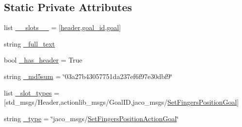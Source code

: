 \subsection*{Static Private Attributes}
\begin{DoxyCompactItemize}
\item 
list \hyperlink{classjaco__msgs_1_1msg_1_1__SetFingersPositionActionGoal_1_1SetFingersPositionActionGoal_a27494990bf3a0ffce3db9626f1a68484}{\+\_\+\+\_\+slots\+\_\+\+\_\+} = \mbox{[}\textquotesingle{}\hyperlink{classjaco__msgs_1_1msg_1_1__SetFingersPositionActionGoal_1_1SetFingersPositionActionGoal_aaab21a95f77c604078e24ad69f6c28c6}{header}\textquotesingle{},\textquotesingle{}\hyperlink{classjaco__msgs_1_1msg_1_1__SetFingersPositionActionGoal_1_1SetFingersPositionActionGoal_a8336121df2ce21765eb1e1e965fc01e5}{goal\+\_\+id}\textquotesingle{},\textquotesingle{}\hyperlink{classjaco__msgs_1_1msg_1_1__SetFingersPositionActionGoal_1_1SetFingersPositionActionGoal_a6914ac9af1a3f57743ec45d16f637698}{goal}\textquotesingle{}\mbox{]}
\item 
string \hyperlink{classjaco__msgs_1_1msg_1_1__SetFingersPositionActionGoal_1_1SetFingersPositionActionGoal_a801eb259de812e405cb93f368f758258}{\+\_\+full\+\_\+text}
\item 
bool \hyperlink{classjaco__msgs_1_1msg_1_1__SetFingersPositionActionGoal_1_1SetFingersPositionActionGoal_ad33973bb721a83437659ef73d9ac61af}{\+\_\+has\+\_\+header} = True
\item 
string \hyperlink{classjaco__msgs_1_1msg_1_1__SetFingersPositionActionGoal_1_1SetFingersPositionActionGoal_af9b4fb039c3b1acb8dd488b1e19921d1}{\+\_\+md5sum} = \char`\"{}03a27b43057751da237ef6f97e30dbf9\char`\"{}
\item 
list \hyperlink{classjaco__msgs_1_1msg_1_1__SetFingersPositionActionGoal_1_1SetFingersPositionActionGoal_ada65df0bd59b42989255cd30b83d2ecc}{\+\_\+slot\+\_\+types} = \mbox{[}\textquotesingle{}std\+\_\+msgs/Header\textquotesingle{},\textquotesingle{}actionlib\+\_\+msgs/Goal\+ID\textquotesingle{},\textquotesingle{}jaco\+\_\+msgs/\hyperlink{classjaco__msgs_1_1msg_1_1__SetFingersPositionGoal_1_1SetFingersPositionGoal}{Set\+Fingers\+Position\+Goal}\textquotesingle{}\mbox{]}
\item 
string \hyperlink{classjaco__msgs_1_1msg_1_1__SetFingersPositionActionGoal_1_1SetFingersPositionActionGoal_a996a4e24257de5fda2e2c0a75cfeff1a}{\+\_\+type} = \char`\"{}jaco\+\_\+msgs/\hyperlink{classjaco__msgs_1_1msg_1_1__SetFingersPositionActionGoal_1_1SetFingersPositionActionGoal}{Set\+Fingers\+Position\+Action\+Goal}\char`\"{}
\end{DoxyCompactItemize}


